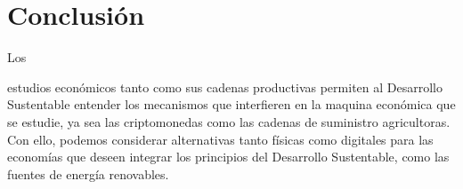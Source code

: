 \documentclass[stu, 12pt, letterpaper, donotrepeattitle, floatsintext, natbib]{apa7}
\begin{document}
\section*{Conclusión}
Los \begin{justifying}
    estudios económicos tanto como sus cadenas productivas permiten al Desarrollo Sustentable entender los mecanismos que interfieren
    en la maquina económica que se estudie, ya sea las criptomonedas como las cadenas de suministro agricultoras. Con ello, podemos considerar
    alternativas tanto físicas como digitales para las economías que deseen integrar los principios del Desarrollo Sustentable, como las fuentes de energía renovables.\par
\end{justifying}
\newpage
\setcounter{secnumdepth}{0} %
\renewcommand\refname{\textbf{Referencias}}
\end{document}
